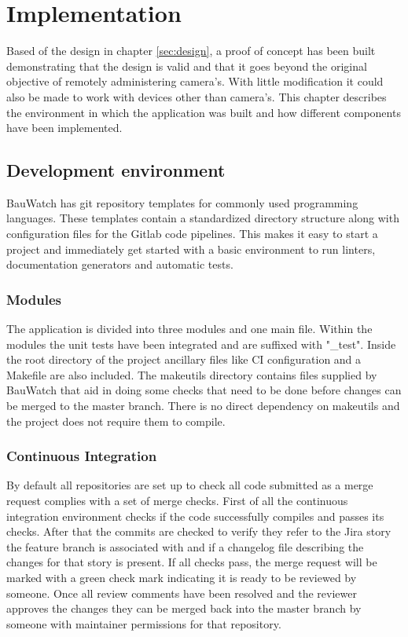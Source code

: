 \chapter{Implementation}
Based of the design in chapter \ref{sec:design}, a proof of concept has been built demonstrating that the design is valid and that it goes beyond the original objective of remotely administering camera's.
With little modification it could also be made to work with devices other than camera's.
This chapter describes the environment in which the application was built and how different components have been implemented.

\section{Development environment}
BauWatch has git repository templates for commonly used programming languages.
These templates contain a standardized directory structure along with configuration files for the Gitlab code pipelines.
This makes it easy to start a project and immediately get started with a basic environment to run linters, documentation generators and automatic tests.

\subsection{Modules}
The application is divided into three modules and one main file.
Within the modules the unit tests have been integrated and are suffixed with "\_test".
Inside the root directory of the project ancillary files like CI configuration and a Makefile are also included.
The makeutils directory contains files supplied by BauWatch that aid in doing some checks that need to be done before changes can be merged to the master branch.
There is no direct dependency on makeutils and the project does not require them to compile.

\subsection{Continuous Integration}
By default all repositories are set up to check all code submitted as a merge request complies with a set of merge checks.
First of all the continuous integration environment checks if the code successfully compiles and passes its checks.
After that the commits are checked to verify they refer to the Jira story the feature branch is associated with and if a changelog file describing the changes for that story is present.
If all checks pass, the merge request will be marked with a green check mark indicating it is ready to be reviewed by someone.
Once all review comments have been resolved and the reviewer approves the changes they can be merged back into the master branch by someone with maintainer permissions for that repository.

